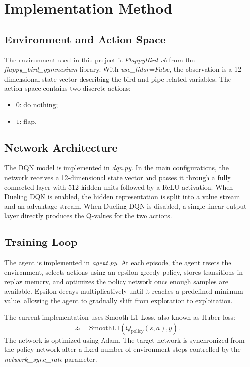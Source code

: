 \documentclass[conference]{IEEEtran}
\begin{document}
\section{Implementation Method}
\subsection{Environment and Action Space}
The environment used in this project is \textit{FlappyBird-v0} from the \textit{flappy\_bird\_gymnasium} library. With \textit{use\_lidar=False}, the observation is a 12-dimensional state vector describing the bird and pipe-related variables. The action space contains two discrete actions:
\begin{itemize}
    \item $0$: do nothing;
    \item $1$: flap.
\end{itemize}

\subsection{Network Architecture}
The DQN model is implemented in \textit{dqn.py}. In the main configurations, the network receives a 12-dimensional state vector and passes it through a fully connected layer with 512 hidden units followed by a ReLU activation. When Dueling DQN is enabled, the hidden representation is split into a value stream and an advantage stream. When Dueling DQN is disabled, a single linear output layer directly produces the Q-values for the two actions.

\subsection{Training Loop}
The agent is implemented in \textit{agent.py}. At each episode, the agent resets the environment, selects actions using an epsilon-greedy policy, stores transitions in replay memory, and optimizes the policy network once enough samples are available. Epsilon decays multiplicatively until it reaches a predefined minimum value, allowing the agent to gradually shift from exploration to exploitation.

The current implementation uses Smooth L1 Loss, also known as Huber loss:
\begin{equation}
\mathcal{L} = \text{SmoothL1}(Q_{\text{policy}}(s,a), y).
\end{equation}
The network is optimized using Adam. The target network is synchronized from the policy network after a fixed number of environment steps controlled by the \textit{network\_sync\_rate} parameter.
\end{document}
